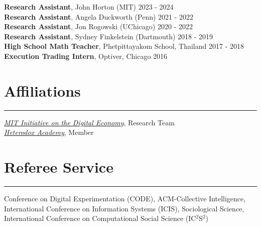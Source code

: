 \documentclass[11.25pt]{article}
\begin{document}
\textbf{Research Assistant}, John Horton (MIT) \hfill 2023 - 2024\\
\textbf{Research Assistant}, Angela Duckworth (Penn) \hfill 2021 - 2022\\
\textbf{Research Assistant}, Jon Rogowski (UChicago) \hfill 2020 - 2022\\
\textbf{Research Assistant}, Sydney Finkelstein (Dartmouth) \hfill 2018 - 2019\\
\textbf{High School Math Teacher}, Phetpittayakom School, Thailand \hfill 2017 - 2018\\
\textbf{Execution Trading Intern}, Optiver, Chicago \hfill 2016

\section*{Affiliations} \hrule
\vspace{3mm}
\href{https://ide.mit.edu/}{\textit{MIT Initiative on the Digital Economy}}, Research Team\\
\href{https://heterodoxacademy.org/}{\textit{Heterodox Academy}}, Member\\

\vspace{-.45cm}

\section*{Referee Service}  \vspace{-1mm} \hrule
\vspace{3mm}
Conference on Digital Experimentation (CODE), ACM-Collective Intelligence, International Conference on Information Systems (ICIS), Sociological Science, International Conference on Computational Social Science (IC$^2$S$^2$)\\
\end{document}

